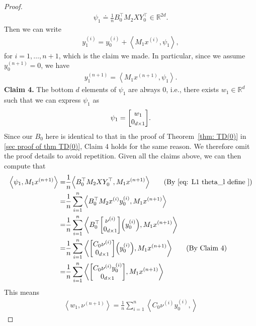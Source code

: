 \documentclass{article}
\newcommand{\explain}[1]{\tag*{(#1)}}
\newcommand{\R}{\mathbb{R}}
\newcommand{\indot}[2]{{\left<#1, #2\right>}}
\begin{document}
\begin{proof}
\begin{align}
      \psi_{1} \doteq \frac{1}{n} B_0^\top M_2 X Y_0^\top \in \R^{2d}. \label{eq: L1 theta_l define }
    \end{align}
    Then we can write
    \begin{align}
        y_{1}^{(i)} = y_0^{(i)} + \indot{M_1 x^{(i)}}{\psi_{1}}, \label{eq: L1 y_l+1 evol theta}
    \end{align}
    for $i=1, \dots, n+1$, which is the claim we made.
    In particular, since we assume $y_0^{(n+1)} = 0$, we have
    \begin{align}
      y_{1}^{(n+1)} = \indot{M_1 x^{(n+1)}}{\psi_{1}}.
    \end{align}
    \textbf{Claim 4.} The bottom $d$ elements of $\psi_1$ are always 0, i.e., there exists $w_1 \in \R^d$ such that we can express $\psi_1$ as
    \begin{align}
        \psi_1 = \mqty[w_1 \\ 0_{d \times 1}]. \label{eq: L1 theta_l sparsity}
    \end{align}
    Since our $B_0$ here is identical to that in the proof of Theorem~\ref{thm: TD(0)} in \ref{sec proof of thm TD(0)}, Claim 4 holds for the same reason. We therefore omit the proof details to avoid repetition.
    Given all the claims above,
    we can then compute that
    \begin{align}
        \indot{\psi_{1}}{M_1 x^{(n+1)}} =& \frac{1}{n}\indot{B_0^\top M_2 X Y_0^\top}{M_1 x^{(n+1)}} \explain{By~\eqref{eq: L1 theta_l define }}\\
        =& \frac{1}{n}\sum_{i=1}^n \indot{B_0^\top M_2 x^{(i)} y_0^{(i)}}{M_1 x^{(n+1)}}\\
        =& \frac{1}{n} \sum_{i=1}^n
        \indot{B_0^\top \mqty[\nu^{(i)} \\0_{d\times 1}]
        \qty(y_0^{(i)})}{M_1 x^{(n+1)}}\\
        =&
        \frac{1}{n} \sum_{i=1}^n
        \indot{\mqty[C_0 \nu^{(i)}\\0_{d\times 1}]
        \qty( y_0^{(i)} )}{M_1 x^{(n+1)}} \explain{By Claim 4}\\
        =&
        \frac{1}{n} \sum_{i=1}^n
        \indot{\mqty[C_0 \nu^{(i)} y_0^{(i)}\\0_{d\times 1}]}
        {M_1 x^{(n+1)}}\\
    \end{align}
    This means
    \begin{align}
        \indot{w_{1}}{\nu^{(n+1)}}
        = \frac{1}{n} \sum_{i=1}^n
        \indot{C_0 \nu^{(i)} y_0^{(i)}}{
}
\end{align}
\end{proof}
\end{document}
